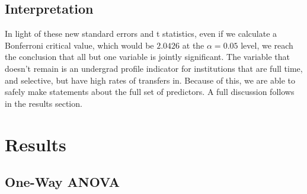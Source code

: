 \documentclass{article}
\begin{document}
\begin{Schunk}
\begin{table}[ht]
\caption{Coefficient Estimation with Robust Standard Errors} 
\end{table}\end{Schunk}

\FloatBarrier

\subsection{Interpretation}

In light of these new standard errors and t statistics, even if we calculate a Bonferroni critical value, which would be $2.0426$ at the $\alpha = 0.05$ level, we reach the conclusion that all but one variable is jointly significant. The variable that doesn't remain is an undergrad profile indicator for institutions that are full time, and selective, but have high rates of transfers in. Because of this, we are able to safely make statements about the full set of predictors. A full discussion follows in the results section.

\section{Results}

\subsection{One-Way ANOVA}
\end{document}
